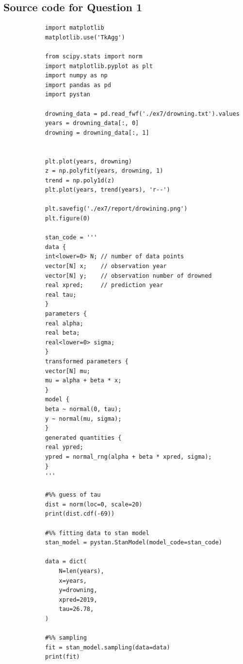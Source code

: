 \documentclass[11pt,a4paper,english]{article}
\begin{document}
      \begin{appendices}
        \section{Source code for Question 1}
        \begin{verbatim}
            import matplotlib
            matplotlib.use('TkAgg')

            from scipy.stats import norm
            import matplotlib.pyplot as plt
            import numpy as np
            import pandas as pd
            import pystan

            drowning_data = pd.read_fwf('./ex7/drowning.txt').values
            years = drowning_data[:, 0]
            drowning = drowning_data[:, 1]


            plt.plot(years, drowning)
            z = np.polyfit(years, drowning, 1)
            trend = np.poly1d(z)
            plt.plot(years, trend(years), 'r--')

            plt.savefig('./ex7/report/drowining.png')
            plt.figure(0)

            stan_code = '''
            data {
            int<lower=0> N; // number of data points
            vector[N] x;    // observation year
            vector[N] y;    // observation number of drowned
            real xpred;     // prediction year
            real tau;
            }
            parameters {
            real alpha;
            real beta;
            real<lower=0> sigma;
            }
            transformed parameters {
            vector[N] mu;
            mu = alpha + beta * x;
            }
            model {
            beta ~ normal(0, tau);
            y ~ normal(mu, sigma);
            }
            generated quantities {
            real ypred;
            ypred = normal_rng(alpha + beta * xpred, sigma);
            }
            '''

            #%% guess of tau
            dist = norm(loc=0, scale=20)
            print(dist.cdf(-69))

            #%% fitting data to stan model
            stan_model = pystan.StanModel(model_code=stan_code)

            data = dict(
                N=len(years),
                x=years,
                y=drowning,
                xpred=2019,
                tau=26.78,
            )

            #%% sampling
            fit = stan_model.sampling(data=data)
            print(fit)


\end{verbatim}
\end{appendices}
\end{document}
